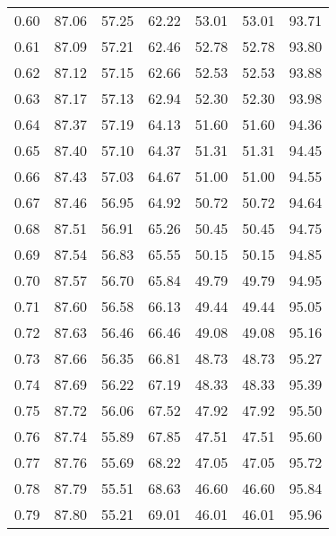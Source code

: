 \begin{tabular}{|c|c|c|c|c|c|c|}
      0.60 &     87.06 &     57.25 &      62.22 &   53.01 &      53.01 &         93.71 \\
      0.61 &     87.09 &     57.21 &      62.46 &   52.78 &      52.78 &         93.80 \\
      0.62 &     87.12 &     57.15 &      62.66 &   52.53 &      52.53 &         93.88 \\
      0.63 &     87.17 &     57.13 &      62.94 &   52.30 &      52.30 &         93.98 \\
      0.64 &     87.37 &     57.19 &      64.13 &   51.60 &      51.60 &         94.36 \\
      0.65 &     87.40 &     57.10 &      64.37 &   51.31 &      51.31 &         94.45 \\
      0.66 &     87.43 &     57.03 &      64.67 &   51.00 &      51.00 &         94.55 \\
      0.67 &     87.46 &     56.95 &      64.92 &   50.72 &      50.72 &         94.64 \\
      0.68 &     87.51 &     56.91 &      65.26 &   50.45 &      50.45 &         94.75 \\
      0.69 &     87.54 &     56.83 &      65.55 &   50.15 &      50.15 &         94.85 \\
      0.70 &     87.57 &     56.70 &      65.84 &   49.79 &      49.79 &         94.95 \\
      0.71 &     87.60 &     56.58 &      66.13 &   49.44 &      49.44 &         95.05 \\
      0.72 &     87.63 &     56.46 &      66.46 &   49.08 &      49.08 &         95.16 \\
      0.73 &     87.66 &     56.35 &      66.81 &   48.73 &      48.73 &         95.27 \\
      0.74 &     87.69 &     56.22 &      67.19 &   48.33 &      48.33 &         95.39 \\
      0.75 &     87.72 &     56.06 &      67.52 &   47.92 &      47.92 &         95.50 \\
      0.76 &     87.74 &     55.89 &      67.85 &   47.51 &      47.51 &         95.60 \\
      0.77 &     87.76 &     55.69 &      68.22 &   47.05 &      47.05 &         95.72 \\
      0.78 &     87.79 &     55.51 &      68.63 &   46.60 &      46.60 &         95.84 \\
      0.79 &     87.80 &     55.21 &      69.01 &   46.01 &      46.01 &         95.96 \\

\end{tabular}
